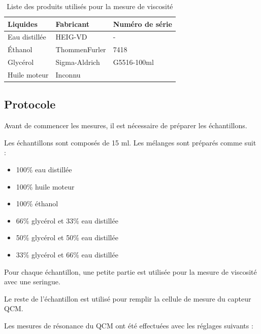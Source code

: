 \begin{table}[H]
    \centering
    \begin{tabular}{|l|l|l|}
        \hline
        \textbf{Liquides}       & \textbf{Fabricant}   & \textbf{Numéro de série} \\
        \hline
        Eau distillée           & HEIG-VD              & -           \\
        Éthanol                 & ThommenFurler        & 7418        \\
        Glycérol                & Sigma-Aldrich        & G5516-100ml \\
        Huile moteur            & Inconnu              &            \\
        \hline
    \end{tabular}
    \caption{Liste des produits utilisés pour la mesure de viscosité}
\end{table}

\subsection{Protocole}

Avant de commencer les mesures, il est nécessaire de préparer les échantillons.

Les échantillons sont composés de 15 ml. Les mélanges sont préparés comme suit :
\begin{itemize}
    \item 100\% eau distillée
    \item 100\% huile moteur
    \item 100\% éthanol
    \item 66\% glycérol et 33\% eau distillée
    \item 50\% glycérol et 50\% eau distillée
    \item 33\% glycérol et 66\% eau distillée
\end{itemize}

Pour chaque échantillon, une petite partie est utilisée pour la mesure de viscosité avec une seringue.

Le reste de l'échantillon est utilisé pour remplir la cellule de mesure du capteur QCM.

Les mesures de résonance du QCM ont été effectuées avec les réglages suivants :

